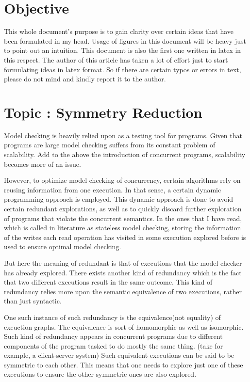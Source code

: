 \section{Objective}

        This whole document's purpose is to gain clarity over certain ideas that have been formulated in my head. 
        Usage of figures in this document will be heavy just to point out an intuition. 
        This document is also the first one written in latex in this respect. 
        The author of this article has taken a lot of effort just to start formulating ideas in latex format. 
        So if there are certain typos or errors in text, please do not mind and kindly report it to the author. 

    \section{Topic : Symmetry Reduction}

        Model checking is heavily relied upon as a testing tool for programs. 
        Given that programs are large model checking suffers from its constant problem of scalability. 
        Add to the above the introduction of concurrent programs, scalability becomes more of an issue. 
        
        However, to optimize model checking of concurrency, certain algorithms rely on reusing information from one execution. 
        In that sense, a certain dynamic programming approach is employed. 
        This dynamic approach is done to avoid certain redundant explorations, as well as to quickly discard further exploration of programs that violate the concurrent semantics.
        In the ones that I have read, which is called in literature as stateless model checking, storing the information of the writes each read operation has visited in some execution explored before is used to ensure optimal model checking. 
        
        But here the meaning of redundant is that of executions that the model checker has already explored. 
        There exists another kind of redundancy which is the fact that two different executions result in the same outcome. 
        This kind of redundancy relies more upon the semantic equivalence of two executions, rather than just syntactic. 

        One such instance of such redundancy is the equivalence(not equality) of exeuction graphs.
        The equivalence is sort of homomorphic as well as isomorphic. 
        Such kind of redundancy appears in concurrent programs due to different components of the program tasked to do mostly the same thing. (take for example, a client-server system)
        Such equivalent executions can be said to be symmetric to each other. 
        This means that one needs to explore just one of these executions to ensure the other symmetric ones are also explored.
